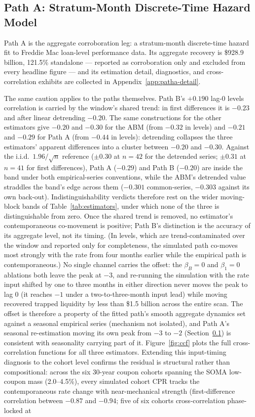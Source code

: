 \documentclass[12pt]{article}
\begin{document}
\subsection{Path A: Stratum-Month Discrete-Time Hazard Model}\label{sec:patha}

Path A is the aggregate corroboration leg: a stratum-month discrete-time hazard fit to Freddie Mac loan-level performance data. Its aggregate recovery is \$928.9 billion, 121.5\% standalone --- reported as corroboration only and excluded from every headline figure --- and its estimation detail, diagnostics, and cross-correlation exhibits are collected in Appendix~\ref{app:patha-detail}.

The same caution applies to the paths themselves. Path B's $+0.190$ lag-0 levels correlation is carried by the window's shared trend: in first differences it is $-0.23$ and after linear detrending $-0.20$. The same constructions for the other estimators give $-0.20$ and $-0.30$ for the ABM (from $-0.32$ in levels) and $-0.21$ and $-0.29$ for Path A (from $-0.44$ in levels): detrending collapses the three estimators' apparent differences into a cluster between $-0.20$ and $-0.30$. Against the i.i.d.\ $1.96/\sqrt{n}$ reference ($\pm 0.30$ at $n = 42$ for the detrended series; $\pm 0.31$ at $n = 41$ for first differences), Path A ($-0.29$) and Path B ($-0.20$) are inside the band under both empirical-series conventions, while the ABM's detrended value straddles the band's edge across them ($-0.301$ common-series, $-0.303$ against its own back-out). Indistinguishability verdicts therefore rest on the wider moving-block bands of Table~\ref{tab:estimators}, under which none of the three is distinguishable from zero. Once the shared trend is removed, no estimator's contemporaneous co-movement is positive; Path B's distinction is the accuracy of its aggregate level, not its timing. (In levels, which are trend-contaminated over the window and reported only for completeness, the simulated path co-moves most strongly with the rate from four months earlier while the empirical path is contemporaneous.) No single channel carries the offset: the $\beta_B = 0$ and $\beta_1 = 0$ ablations both leave the peak at $-3$, and re-running the simulation with the rate input shifted by one to three months in either direction never moves the peak to lag 0 (it reaches $-1$ under a two-to-three-month input lead) while moving recovered trapped liquidity by less than \$1.5 billion across the entire scan. The offset is therefore a property of the fitted path's smooth aggregate dynamics set against a seasonal empirical series (mechanism not isolated), and Path A's seasonal re-estimation moving its own peak from $-3$ to $-2$ (Section~\ref{sec:patha}) is consistent with seasonality carrying part of it. Figure~\ref{fig:ccf} plots the full cross-correlation functions for all three estimators. Extending this input-timing diagnosis to the cohort level confirms the residual is structural rather than compositional: across the six 30-year coupon cohorts spanning the SOMA low-coupon mass (2.0--4.5\%), every simulated cohort CPR tracks the contemporaneous rate change with near-mechanical strength (first-difference correlation between $-0.87$ and $-0.94$; five of six cohorts cross-correlation phase-locked at 
\end{document}
